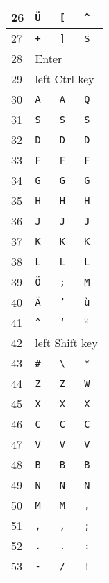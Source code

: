 \begin{longtable}{|l|l|l|l|}
  26 & \texttt{Ü} & \texttt{[} & \texttt{\^} \\ \hline
  27 & \texttt{+} & \texttt{]} & \texttt{\$} \\ \hline
  28 & \multicolumn{3}{|l|}{Enter} \\ \hline
  29 & \multicolumn{3}{|l|}{left Ctrl key} \\ \hline
  30 & \texttt{A} & \texttt{A} & \texttt{Q} \\ \hline
  31 & \texttt{S} & \texttt{S} & \texttt{S} \\ \hline
  32 & \texttt{D} & \texttt{D} & \texttt{D} \\ \hline
  33 & \texttt{F} & \texttt{F} & \texttt{F} \\ \hline
  34 & \texttt{G} & \texttt{G} & \texttt{G} \\ \hline
  35 & \texttt{H} & \texttt{H} & \texttt{H} \\ \hline
  36 & \texttt{J} & \texttt{J} & \texttt{J} \\ \hline
  37 & \texttt{K} & \texttt{K} & \texttt{K} \\ \hline
  38 & \texttt{L} & \texttt{L} & \texttt{L} \\ \hline
  39 & \texttt{Ö} & \texttt{;} & \texttt{M} \\ \hline
  40 & \texttt{Ä} & \texttt{'} & \texttt{ù} \\ \hline
  41 & \texttt{\^} & \texttt{`} & $^2$ \\ \hline
  42 & \multicolumn{3}{|l|}{left Shift key} \\ \hline
  43 & \texttt{\#} & \texttt{\textbackslash} & \texttt{*} \\ \hline
  44 & \texttt{Z} & \texttt{Z} & \texttt{W} \\ \hline
  45 & \texttt{X} & \texttt{X} & \texttt{X} \\ \hline
  46 & \texttt{C} & \texttt{C} & \texttt{C} \\ \hline
  47 & \texttt{V} & \texttt{V} & \texttt{V} \\ \hline
  48 & \texttt{B} & \texttt{B} & \texttt{B} \\ \hline
  49 & \texttt{N} & \texttt{N} & \texttt{N} \\ \hline
  50 & \texttt{M} & \texttt{M} & \texttt{,} \\ \hline
  51 & \texttt{,} & \texttt{,} & \texttt{;} \\ \hline
  52 & \texttt{.} & \texttt{.} & \texttt{:} \\ \hline
  53 & \texttt{-} & \texttt{/} & \texttt{!} \\ \hline

\end{longtable}
